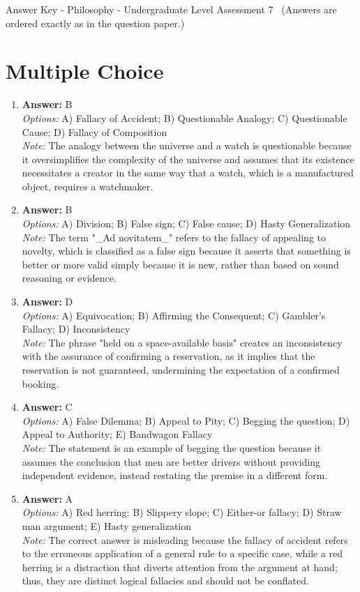 \documentclass[12pt]{article}
\begin{document}
\begin{center}
Answer Key - Philosophy - Undergraduate Level Assessment 7 \
\small (Answers are ordered exactly as in the question paper.)
\end{center}

\section*{Multiple Choice}
\begin{enumerate}[label=\arabic*.]
\item \textbf{Answer:} B
\\ \textit{Options:} A) Fallacy of Accident; B) Questionable Analogy; C) Questionable Cause; D) Fallacy of Composition
\\ \textit{Note:} The analogy between the universe and a watch is questionable because it oversimplifies the complexity of the universe and assumes that its existence necessitates a creator in the same way that a watch, which is a manufactured object, requires a watchmaker.
\item \textbf{Answer:} B
\\ \textit{Options:} A) Division; B) False sign; C) False cause; D) Hasty Generalization
\\ \textit{Note:} The term "\_Ad novitatem\_" refers to the fallacy of appealing to novelty, which is classified as a false sign because it asserts that something is better or more valid simply because it is new, rather than based on sound reasoning or evidence.
\item \textbf{Answer:} D
\\ \textit{Options:} A) Equivocation; B) Affirming the Consequent; C) Gambler's Fallacy; D) Inconsistency
\\ \textit{Note:} The phrase "held on a space-available basis" creates an inconsistency with the assurance of confirming a reservation, as it implies that the reservation is not guaranteed, undermining the expectation of a confirmed booking.
\item \textbf{Answer:} C
\\ \textit{Options:} A) False Dilemma; B) Appeal to Pity; C) Begging the question; D) Appeal to Authority; E) Bandwagon Fallacy
\\ \textit{Note:} The statement is an example of begging the question because it assumes the conclusion that men are better drivers without providing independent evidence, instead restating the premise in a different form.
\item \textbf{Answer:} A
\\ \textit{Options:} A) Red herring; B) Slippery slope; C) Either-or fallacy; D) Straw man argument; E) Hasty generalization
\\ \textit{Note:} The correct answer is misleading because the fallacy of accident refers to the erroneous application of a general rule to a specific case, while a red herring is a distraction that diverts attention from the argument at hand; thus, they are distinct logical fallacies and should not be conflated.
\end{enumerate}
\end{document}

